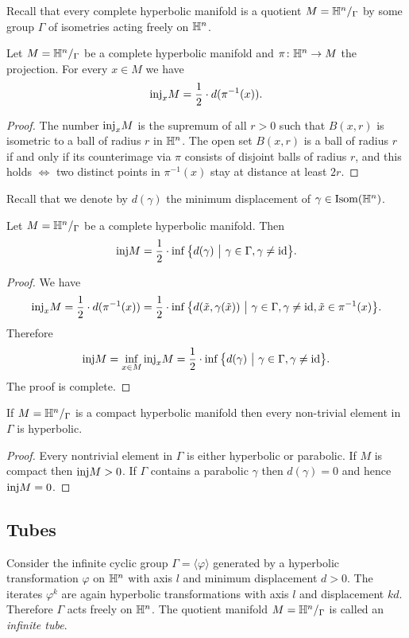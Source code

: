 Recall that every complete hyperbolic manifold is a quotient $M=\mathbb{H}^n/_\Gamma$ by some group $\Gamma$ of isometries acting freely on $\mathbb{H}^n$. 

\begin{prop} \label{d:prop}
Let $M=\mathbb{H}^n/_\Gamma$ be a complete hyperbolic manifold and $\pi\colon \mathbb{H}^n \to M$ the projection. For every $x\in M$ we have
$${\rm inj}_xM = \frac 12 \cdot d(\pi^{-1}(x)).$$
\end{prop}
\begin{proof}
The number ${\rm inj}_x M$ is the supremum of all $r>0$ such that $B(x,r)$ is isometric to a ball of radius $r$ in $\mathbb{H}^n$. The open set $B(x,r)$ is a ball of radius $r$ if and only if its counterimage via $\pi$ consists of disjoint balls of radius $r$, and this holds $\Leftrightarrow$ two distinct points in $\pi^{-1}(x)$ stay at distance at least $2r$.
\end{proof}

Recall that we denote by $d(\gamma)$ the minimum displacement of $\gamma \in {\rm Isom}(\mathbb{H}^n)$.

\begin{cor} \label{inj:cor}
Let $M=\mathbb{H}^n/_\Gamma$ be a complete hyperbolic manifold. Then
$${\rm inj} M = \frac 12 \cdot \inf \big\{d(\gamma)\ \big|\ \gamma \in \Gamma, \gamma \neq {\rm id}\big\}.$$
\end{cor}
\begin{proof}
We have
$${\rm inj}_xM = \frac 12 \cdot d(\pi^{-1}(x)) = \frac 12 \cdot \inf \big\{ d(\tilde x, \gamma(\tilde x)) \ \big|\ \gamma\in \Gamma, \gamma\neq {\rm id}, \tilde x \in \pi^{-1}(x)\big\}. $$
Therefore
$${\rm inj} M = \inf_{x\in M} {\rm inj}_x M = 
\frac 12 \cdot \inf \big\{ d(\gamma)\ \big| \ \gamma \in \Gamma, \gamma \neq {\rm id} \big\}.$$
The proof is complete.
\end{proof}

\begin{cor}
If $M=\mathbb{H}^n/_\Gamma$ is a compact hyperbolic manifold then every non-trivial element in $\Gamma$ is hyperbolic.
\end{cor}
\begin{proof}
Every nontrivial element in $\Gamma$ is either hyperbolic or parabolic.
If $M$ is compact then ${\rm inj} M >0$. If $\Gamma$ contains a parabolic $\gamma$ then $d(\gamma)=0$ and hence ${\rm inj} M =0$.
\end{proof}

\subsection{Tubes} \label{tubes:subsection}
Consider the infinite cyclic group $\Gamma = \langle \varphi \rangle$ generated by a hyperbolic transformation $\varphi$ on $\mathbb{H}^n$ with axis $l$ and minimum displacement $d>0$. The iterates $\varphi^k$ are again hyperbolic transformations with axis $l$ and displacement $kd$. Therefore $\Gamma$ acts freely on $\mathbb{H}^n$.
The quotient manifold $M=\mathbb{H}^n/_\Gamma$ is called an \emph{infinite tube}. 

